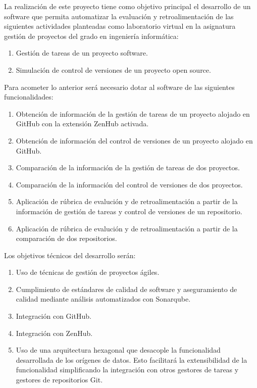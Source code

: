 
La realización de este proyecto tiene como objetivo principal el desarrollo de un software que permita automatizar la evaluación y retroalimentación de las siguientes actividades planteadas como laboratorio virtual en la asignatura gestión de proyectos del grado en ingeniería informática:

\begin{enumerate}
	\item Gestión de tareas de un proyecto software. 
	\item Simulación de control de versiones de un proyecto open source.
\end{enumerate}

Para acometer lo anterior será necesario dotar al software de las siguientes funcionalidades:

\begin{enumerate}
	\item Obtención de información de la gestión de tareas de un proyecto alojado en GitHub con la extensión ZenHub activada.	
	\item Obtención de información del control de versiones de un proyecto alojado en GitHub.
	\item Comparación de la información de la gestión de tareas de dos proyectos.
	\item Comparación de la información del control de versiones de dos proyectos.			
	\item Aplicación de rúbrica de evalución y de retroalimentación a partir de la información de gestión de tareas y control de versiones de un repositorio.
	\item Aplicación de rúbrica de evalución y de retroalimentación a partir de la comparación de dos repositorios.	 		  
\end{enumerate}

Los objetivos  técnicos del desarrollo serán:

\begin{enumerate}
	\item Uso de técnicas de gestión de proyectos ágiles.
	\item Cumplimiento de estándares de calidad de software y aseguramiento de calidad mediante análisis automatizados con Sonarqube.
	\item Integración con GitHub. 
	\item Integración con ZenHub.
	\item Uso de una arquitectura hexagonal que desacople la funcionalidad desarrollada de los orígenes de datos. Esto facilitará la extensibilidad de la funcionalidad simplificando la  integración con otros gestores de tareas y gestores de repositorios Git.
\end{enumerate}


